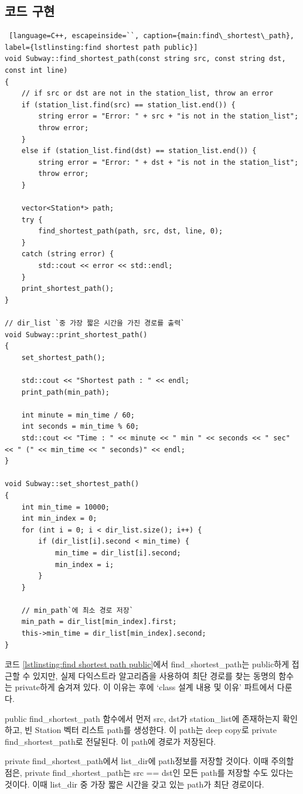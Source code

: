\documentclass{article}
\begin{document}
\subsection{코드 구현}
\begin{lstlisting} [language=C++, escapeinside=``, caption={main:find\_shortest\_path}, label={lstlinsting:find shortest path public}]
void Subway::find_shortest_path(const string src, const string dst, const int line)
{
	// if src or dst are not in the station_list, throw an error
	if (station_list.find(src) == station_list.end()) {
		string error = "Error: " + src + "is not in the station_list";
		throw error;
	}
	else if (station_list.find(dst) == station_list.end()) {
		string error = "Error: " + dst + "is not in the station_list";
		throw error;
	}
	
	vector<Station*> path;
	try {
		find_shortest_path(path, src, dst, line, 0);
	}
	catch (string error) {
		std::cout << error << std::endl;
	}
	print_shortest_path();
}

// dir_list `중 가장 짧은 시간을 가진 경로를 출력`
void Subway::print_shortest_path()
{
	set_shortest_path();
	
	std::cout << "Shortest path : " << endl;
	print_path(min_path);

	int minute = min_time / 60;
	int seconds = min_time % 60;
	std::cout << "Time : " << minute << " min " << seconds << " sec" << " (" << min_time << " seconds)" << endl;
}

void Subway::set_shortest_path()
{
	int min_time = 10000;
	int min_index = 0;
	for (int i = 0; i < dir_list.size(); i++) {
		if (dir_list[i].second < min_time) {
			min_time = dir_list[i].second;
			min_index = i;
		}
	}

	// min_path`에 최소 경로 저장`
	min_path = dir_list[min_index].first;
	this->min_time = dir_list[min_index].second;
}
\end{lstlisting}

코드 \ref{lstlinsting:find shortest path public}에서 find\_shortest\_path는 public하게 접근할 수 있지만, 실제 다익스트라 알고리즘을 사용하여 최단 경로를 찾는 동명의 함수는 private하게 숨겨져 있다. 이 이유는 후에 `class 설계 내용 및 이유' 파트에서 다룬다.

public find\_shortest\_path 함수에서 먼저 src, dst가 station\_list에 존재하는지 확인하고, 빈 Station 벡터 리스트 path를 생성한다. 이 path는 deep copy로 private find\_shortest\_path로 전달된다. 이 path에 경로가 저장된다.

private find\_shortest\_path에서 list\_dir에 path정보를 저장할 것이다. 이때 주의할 점은, private find\_shortest\_path는 src == dst인 모든 path를 저장할 수도 있다는 것이다. 이때 list\_dir 중 가장 짧은 시간을 갖고 있는 path가 최단 경로이다.
\end{document}
